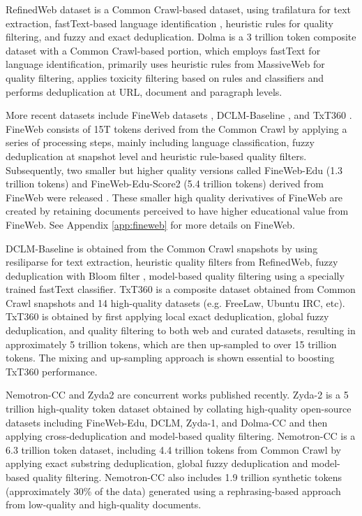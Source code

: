 RefinedWeb dataset \cite{penedo2023refinedweb} is a Common Crawl-based dataset, using trafilatura \cite{trafilatura} for text extraction, fastText-based language identification \cite{joulin2017bag}, heuristic rules for quality filtering, and fuzzy and exact deduplication. Dolma \cite{soldaini2024dolma} is a 3 trillion token composite dataset with a Common Crawl-based portion, which employs fastText for language identification, primarily uses heuristic rules from MassiveWeb \cite{rae2021scaling} for quality filtering, applies toxicity filtering based on rules and classifiers and performs deduplication at URL, document and paragraph levels. 

More recent datasets include FineWeb datasets \cite{penedo2024fineweb}, DCLM-Baseline \cite{li2024datacomplm}, and TxT360 \cite{txt360data2024}. FineWeb consists of 15T tokens derived from the Common Crawl by applying a series of processing steps, mainly including language classification, fuzzy deduplication at snapshot level and heuristic rule-based quality filters. 
Subsequently, two smaller but higher quality versions called FineWeb-Edu (1.3 trillion tokens) and FineWeb-Edu-Score2 (5.4 trillion tokens) derived from FineWeb were released \cite{penedo2024fineweb}. These smaller high quality derivatives of FineWeb are created by retaining documents perceived to have higher educational value from FineWeb. See Appendix \ref{app:fineweb} for more details on FineWeb.

DCLM-Baseline is obtained from the Common Crawl snapshots by using resiliparse \cite{resiliparse} for text extraction,  heuristic quality filters from RefinedWeb, fuzzy deduplication with Bloom filter \cite{bff}, model-based quality filtering using a specially trained fastText classifier. TxT360 is a composite dataset obtained from Common Crawl snapshots and 14 high-quality datasets (e.g. FreeLaw, Ubuntu IRC, etc). TxT360 is obtained by first applying local exact deduplication, global fuzzy deduplication, and quality filtering to both web and curated datasets, resulting in approximately 5 trillion tokens, which are then up-sampled to over 15 trillion tokens. The mixing and up-sampling approach is shown essential to boosting TxT360 performance. 

Nemotron-CC \cite{su2024nemotron} and Zyda2 \cite{tokpanov2024zyda} are concurrent works published recently. Zyda-2 is a 5 trillion high-quality token dataset obtained by collating high-quality open-source datasets including FineWeb-Edu, DCLM, Zyda-1, and Dolma-CC and then applying cross-deduplication and model-based quality filtering. Nemotron-CC is a 6.3 trillion token dataset, including 4.4 trillion tokens from Common Crawl by applying exact substring deduplication, global fuzzy deduplication and model-based quality filtering. Nemotron-CC also includes 1.9 trillion synthetic tokens (approximately 30\% of the data) generated using a rephrasing-based approach from low-quality and high-quality documents.

